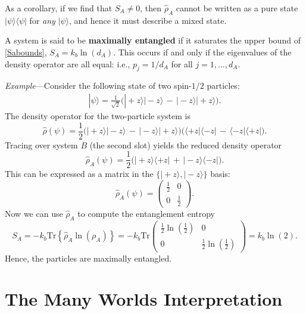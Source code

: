 \documentclass[pra,12pt]{revtex4}
\begin{document}
As a corollary, if we find that $S_{A} \ne 0$, then $\hat{\rho}_A$
cannot be written as a pure state $|\psi\rangle\langle\psi|$ for
\textit{any} $|\psi\rangle$, and hence it must describe a mixed state.

A system is said to be \textbf{maximally entangled} if it saturates
the upper bound of \eqref{Sabounds}, $S_A = k_b \ln(d_A)$.  This
occurs if and only if the eigenvalues of the density operator are all
equal: i.e., $p_j = 1/d_A$ for all $j = 1, \dots, d_A$.

\begin{framed}
\noindent
\textit{Example}---Consider the following state of two spin-$1/2$
particles:
\begin{align}
  |\psi\rangle = \frac{1}{\sqrt{2}} \Big(|\!+\!z\rangle|\!-\!z\rangle \,-\, |\!-\!z\rangle|\!+\!z\rangle\Big).
\end{align}
The density operator for the two-particle system is
\begin{equation}
  \hat{\rho}(\psi) = \frac{1}{2} \Big(|\!+\!z\rangle|\!-\!z\rangle \,-\, |\!-\!z\rangle|\!+\!z\rangle\Big) \Big(\langle+z|\langle-z| \,-\, \langle-z|\langle+z|\Big).
\end{equation}
Tracing over system $B$ (the second slot) yields the reduced density operator
\begin{equation}
  \hat{\rho}_A(\psi) = \frac{1}{2} \Big(|\!+\!z\rangle \langle+z| \,+\, |\!-\!z\rangle \langle-z|\Big).
\end{equation}
This can be expressed as a matrix in the
$\{|\!+z\rangle,|\!-z\rangle\}$ basis:
\begin{equation}
  \hat{\rho}_A(\psi) = \begin{pmatrix}\frac{1}{2} & 0 \\ 0 & \frac{1}{2}\end{pmatrix}.
\end{equation}
Now we can use $\hat{\rho}_A$ to compute the entanglement entropy
\begin{equation}
  S_A = -k_b\mathrm{Tr}\left\{\hat{\rho}_A\ln(\rho_A)\right\} = -k_b\mathrm{Tr}\begin{pmatrix}\frac{1}{2}\ln\left(\frac{1}{2}\right) & 0 \\ 0 & \frac{1}{2}\ln\left(\frac{1}{2}\right)\end{pmatrix} = k_b\ln(2).
\end{equation}
Hence, the particles are maximally entangled.
\end{framed}

\section{The Many Worlds Interpretation}
\end{document}
